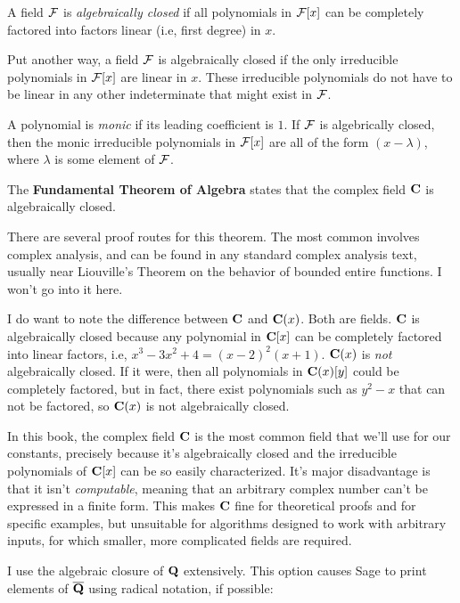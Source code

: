 \begin{key point}
A field ${\cal F}$ is {\it algebraically closed} if all
polynomials in ${\cal F}[x]$ can be completely factored
into factors linear (i.e, first degree) in $x$.
\end{key point}

Put another way, a field ${\cal F}$ is algebraically closed if the
only irreducible polynomials in ${\cal F}[x]$ are linear in $x$.
These irreducible polynomials do not have to be linear in any other
indeterminate that might exist in ${\cal F}$.

A polynomial is {\it monic} if its leading coefficient is $1$.  If
${\cal F}$ is algebrically closed, then the monic irreducible
polynomials in ${\cal F}[x]$ are all of the form $(x-\lambda)$, where
$\lambda$ is some element of ${\cal F}$.

\begin{key point}
The {\bf Fundamental Theorem of
Algebra} states that the complex field ${\bf C}$ is algebraically
closed.
\end{key point}

There are several proof routes for this theorem.  The most
common involves complex analysis, and can be found in any standard
complex analysis text, usually near Liouville's Theorem on the
behavior of bounded entire functions.  I won't go into it here.

I do want to note the difference between ${\bf C}$ and ${\bf C}(x)$.
Both are fields.  ${\bf C}$ is algebraically closed because any
polynomial in ${\bf C}[x]$ can be completely factored into linear
factors, i.e, $x^3-3x^2+4=(x-2)^2(x+1)$.  ${\bf C}(x)$ is {\it not} algebraically closed.
If it were, then all polynomials in ${\bf C}(x)[y]$ could
be completely factored, but in fact, there exist polynomials
such as $y^2-x$ that can not be factored, so ${\bf C}(x)$
is not algebraically closed.

In this book, the complex field ${\bf C}$ is the most common field
that we'll use for our constants, precisely because it's algebraically
closed and the irreducible polynomials of ${\bf C}[x]$ can be so
easily characterized.  It's major disadvantage is that it isn't {\it
computable}, meaning that an arbitrary complex number can't be
expressed in a finite form.  This makes ${\bf C}$ fine for theoretical
proofs and for specific examples, but unsuitable for algorithms
designed to work with arbitrary inputs, for which smaller,
more complicated fields are required.

I use the algebraic closure of ${\bf Q}$ extensively.  This
option causes Sage to print elements of $\overline{\bf Q}$
using radical notation, if possible:

